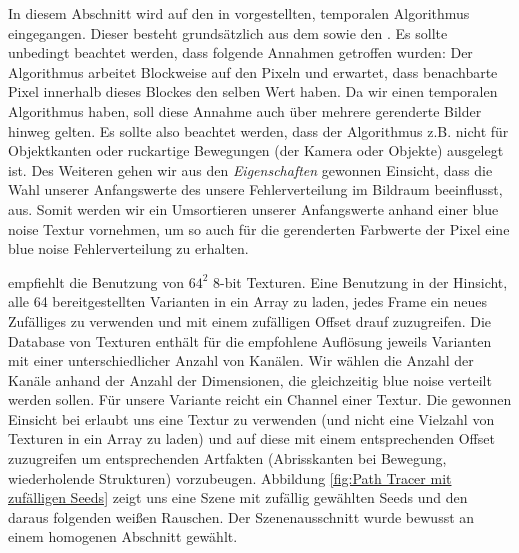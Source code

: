 In diesem Abschnitt wird auf den in \cite{hal02158423} vorgestellten, temporalen Algorithmus eingegangen.
Dieser besteht grundsätzlich aus dem  sowie den 
. Es sollte unbedingt beachtet werden, dass folgende
Annahmen getroffen wurden: Der Algorithmus arbeitet Blockweise auf den Pixeln und erwartet, dass benachbarte
Pixel innerhalb dieses Blockes den selben Wert haben. Da wir einen temporalen Algorithmus haben, soll diese Annahme 
auch über mehrere gerenderte Bilder hinweg gelten. Es sollte also beachtet werden, dass der Algorithmus z.B. nicht 
für Objektkanten oder ruckartige Bewegungen (der Kamera oder Objekte) ausgelegt ist.
Des Weiteren gehen wir aus den  \textit{Eigenschaften}
gewonnen Einsicht, dass die Wahl 
unserer Anfangswerte des  unsere 
Fehlerverteilung im Bildraum beeinflusst, aus. Somit werden wir ein Umsortieren
unserer Anfangswerte anhand einer blue noise Textur vornehmen, um so auch 
für die gerenderten Farbwerte der Pixel eine blue noise Fehlerverteilung zu 
erhalten. 

\par
\cite{bluenoisechrisschied} empfiehlt die Benutzung von $64^{2}$ 8-bit 
Texturen. Eine Benutzung in der Hinsicht, alle 64 bereitgestellten Varianten
in ein Array zu laden, jedes Frame ein neues Zufälliges zu verwenden und
mit einem zufälligen Offset drauf zuzugreifen. Die Database von Texturen 
\cite{bluenoisechrisschied} enthält für die empfohlene Auflösung jeweils
Varianten mit einer unterschiedlicher Anzahl von Kanälen. Wir wählen
die Anzahl der Kanäle anhand der Anzahl der Dimensionen, die gleichzeitig
blue noise verteilt werden sollen. Für unsere Variante reicht ein Channel 
einer Textur. Die gewonnen Einsicht bei 
erlaubt uns eine Textur zu verwenden (und nicht eine Vielzahl von Texturen in ein
Array zu laden) und auf diese mit einem entsprechenden Offset zuzugreifen um 
entsprechenden Artfakten (Abrisskanten bei Bewegung, wiederholende Strukturen) 
vorzubeugen.
Abbildung \ref{fig:Path Tracer mit zufälligen Seeds} zeigt uns eine Szene mit zufällig 
gewählten Seeds und den daraus folgenden weißen Rauschen. Der Szenenausschnitt wurde
bewusst an einem homogenen Abschnitt gewählt. 

